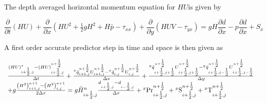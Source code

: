 \documentclass{article}
\begin{document}
\noindent 

\noindent The depth averaged horizontal momentum equation for $HU$is given by

\noindent 
\begin{equation} \label{ZEqnNum973790} 
\frac{\partial }{\partial t} \left(HU\right)+\frac{\partial }{\partial x} \left(HU^{2} +{\tfrac{1}{2}} gH^{2} +H\bar{p}-\tau _{xx} \right)+\frac{\partial }{\partial y} \left(HUV-\tau _{yx} \right)=gH\frac{\partial d}{\partial x} -p\frac{\partial d}{\partial x} +S_{x}  
\end{equation} 


\noindent A first order accurate predictor step in time and space is then given as

\noindent 
\begin{equation} \label{ZEqnNum947132} 
\begin{array}{l} {\frac{\left(HU\right)_{i+{\tfrac{1}{2}} ,j}^{*} -\left(HU\right)_{i+{\tfrac{1}{2}} ,j}^{n+{\tfrac{1}{2}} } }{\Delta t} +\frac{{}^{x} \bar{q}_{i+1,j}^{n+{\tfrac{1}{2}} } U_{i+1,j}^{n+{\tfrac{1}{2}} } -{}^{x} \bar{q}_{i,j}^{n+{\tfrac{1}{2}} } U_{i,j}^{n+{\tfrac{1}{2}} } }{\Delta x} +\frac{{}^{y} \bar{q}_{i+{\tfrac{1}{2}} ,j+{\tfrac{1}{2}} }^{n+{\tfrac{1}{2}} } U_{i+{\tfrac{1}{2}} ,j+{\tfrac{1}{2}} }^{n+{\tfrac{1}{2}} } -{}^{y} \bar{q}_{i+{\tfrac{1}{2}} ,j-{\tfrac{1}{2}} }^{n+{\tfrac{1}{2}} } U_{i+{\tfrac{1}{2}} ,j-{\tfrac{1}{2}} }^{n+{\tfrac{1}{2}} } }{\Delta y} } \\ {+g\frac{\left(H^{2} \right)_{i+1,j}^{n+1} -\left(H^{2} \right)_{i,j}^{n+1} }{2\Delta x} =g\bar{H}_{i+{\tfrac{1}{2}} ,j}^{n} \frac{d_{i+{\tfrac{1}{2}} ,j} -d_{i-{\tfrac{1}{2}} ,j} }{\Delta x} +{}^{x} {\rm Pr}_{i+{\tfrac{1}{2}} ,j}^{n+{\tfrac{1}{2}} } +{}^{x} {\rm S}_{i+{\tfrac{1}{2}} ,j}^{n+{\tfrac{1}{2}} } +{}^{x} {\rm T}_{i+{\tfrac{1}{2}} ,j}^{n+{\tfrac{1}{2}} } } \end{array} 
\end{equation} 
\end{document}
